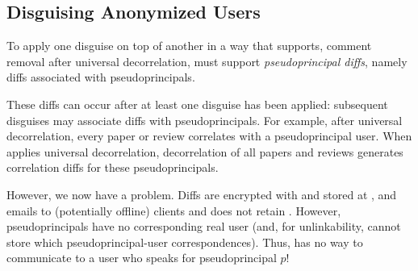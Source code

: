 \subsection{Disguising Anonymized Users}


To apply one disguise on top of another in a way that supports, \eg comment removal after universal
decorrelation, \sys must support \emph{pseudoprincipal diffs}, namely diffs associated with
pseudoprincipals. 

These diffs can occur after at least one disguise has been applied: subsequent disguises may
associate diffs with pseudoprincipals. For example, after universal decorrelation, every paper or
review correlates with a pseudoprincipal user. When \sys applies universal decorrelation,
decorrelation of all papers and reviews generates correlation diffs for these pseudoprincipals.

However, we now have a problem. Diffs are encrypted with  and stored at
, and \sys emails  to (potentially offline) clients and does not retain
.  However, pseudoprincipals have no corresponding real user (and, for unlinkability, \sys
cannot store which pseudoprincipal-user correspondences). Thus, \sys has no way to communicate
 to a user who speaks for pseudoprincipal $p$!

